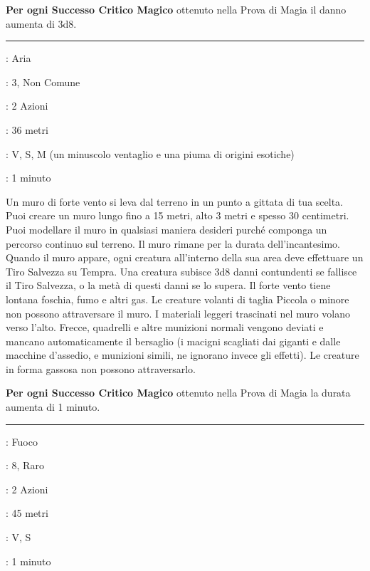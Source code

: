 \begin{multicols}{2}
\textbf{Per ogni Successo Critico Magico} ottenuto nella Prova di Magia il danno aumenta di 3d8.

\smallskip\noindent\rule{\linewidth}{2pt} \hypertarget{Muro di Vento}{}\smallskip{}
\noindent
\begin{description}[noitemsep, topsep=0pt, parsep=0pt, partopsep=0pt, leftmargin=0cm, labelwidth=2.8cm]
	\item[\textbf{Lista di Magia}]: Aria
	\item[\textbf{Livello}]: 3, Non Comune
	\item[\textbf{T. di Lancio}]: 2 Azioni
	\item[\textbf{Gittata}]: 36 metri
	\item[\textbf{Componenti}]: V, S, M (un minuscolo ventaglio e una piuma di origini esotiche)
	\item[\textbf{Durata}]: 1 minuto
\end{description}

Un muro di forte vento si leva dal terreno in un punto a gittata di tua scelta. Puoi creare un muro lungo fino a 15 metri, alto 3 metri e spesso 30 centimetri. Puoi modellare il muro in qualsiasi maniera desideri purché componga un percorso continuo sul terreno. Il muro rimane per la durata dell'incantesimo. Quando il muro appare, ogni creatura all'interno della sua area deve effettuare un Tiro Salvezza su Tempra. Una creatura subisce 3d8 danni contundenti se fallisce il Tiro Salvezza, o la metà di questi danni se lo supera. Il forte vento tiene lontana foschia, fumo e altri gas. Le creature volanti di taglia Piccola o minore non possono attraversare il muro. I materiali leggeri trascinati nel muro volano verso l'alto. Frecce, quadrelli e altre munizioni normali vengono deviati e mancano automaticamente il bersaglio (i macigni scagliati dai giganti e dalle macchine d'assedio, e munizioni simili, ne ignorano invece gli effetti). Le creature in forma gassosa non possono attraversarlo.

\textbf{Per ogni Successo Critico Magico} ottenuto nella Prova di Magia la durata aumenta di 1 minuto.

\smallskip\noindent\rule{\linewidth}{2pt} \hypertarget{Nube Incendiaria}{}\smallskip{}
\noindent
\begin{description}[noitemsep, topsep=0pt, parsep=0pt, partopsep=0pt, leftmargin=0cm, labelwidth=2.8cm]
	\item[\textbf{Lista di Magia}]: Fuoco
	\item[\textbf{Livello}]: 8, Raro
	\item[\textbf{T. di Lancio}]: 2 Azioni
	\item[\textbf{Gittata}]: 45 metri
	\item[\textbf{Componenti}]: V, S
	\item[\textbf{Durata}]: 1 minuto
\end{description}


\end{multicols}
